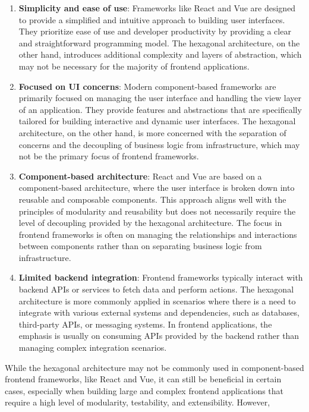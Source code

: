 \documentclass[../design.tex]{subfiles}
\begin{document}
\begin{enumerate}[label = -]
	\item\textbf{Simplicity and ease of use}: Frameworks like React and Vue are
	designed to provide a simplified and intuitive approach to building user
	interfaces. They prioritize ease of use and developer productivity by
	providing a clear and straightforward programming model. The hexagonal
	architecture, on the other hand, introduces additional complexity and
	layers of abstraction, which may not be necessary for the majority of
	frontend applications.
	\item\textbf{Focused on UI concerns}: Modern component-based frameworks are
	primarily focused on managing the user interface and handling the view
	layer of an application. They provide features and abstractions that are
	specifically tailored for building interactive and dynamic user
	interfaces. The hexagonal architecture, on the other hand, is more
	concerned with the separation of concerns and the decoupling of business
	logic from infrastructure, which may not be the primary focus of frontend
	frameworks.
	\item\textbf{Component-based architecture}: React and Vue are based on a
	component-based architecture, where the user interface is broken down into
	reusable and composable components. This approach aligns well with the
	principles of modularity and reusability but does not necessarily require
	the level of decoupling provided by the hexagonal architecture. The focus
	in frontend frameworks is often on managing the relationships and
	interactions between components rather than on separating business logic
	from infrastructure.
	\item\textbf{Limited backend integration}: Frontend frameworks typically
	interact with backend APIs or services to fetch data and perform actions.
	The hexagonal architecture is more commonly applied in scenarios where
	there is a need to integrate with various external systems and
	dependencies, such as databases, third-party APIs, or messaging systems.
	In frontend applications, the emphasis is usually on consuming APIs
	provided by the backend rather than managing complex integration
	scenarios.
\end{enumerate}
While the hexagonal architecture may not be commonly used in component-based
frontend frameworks, like React and Vue, it can still be beneficial in certain
cases, especially when building large and complex frontend applications that
require a high level of modularity, testability, and extensibility. However,
\end{document}
